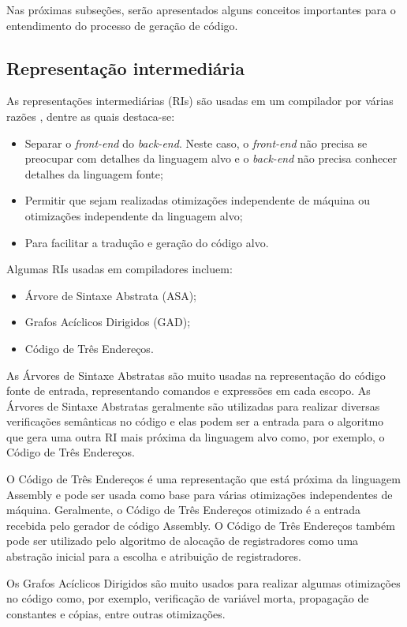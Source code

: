 \documentclass[
	12pt,				%
	openright,			%
	oneside,			%
	a4paper,			%
	main=brazil,
	english,			%
	]{ufsj-abntex2}
\begin{document}
Nas próximas subseções, serão apresentados alguns conceitos importantes para o entendimento do processo de geração de código. 

\subsection{Representação intermediária}

As representações intermediárias (RIs) são usadas em um compilador por várias razões \cite{dragonBook}, dentre as quais destaca-se: 
\begin{itemize}
    \item Separar o \textit{front-end} do \textit{back-end}. Neste caso, o \textit{front-end} não precisa se preocupar com detalhes da linguagem alvo e o \textit{back-end} não precisa conhecer detalhes da linguagem fonte;
    \item Permitir que sejam realizadas otimizações independente de máquina ou otimizações independente da linguagem alvo; 
    \item Para facilitar a tradução e geração do código alvo.    
\end{itemize}

Algumas RIs usadas em compiladores incluem:  
\begin{itemize}
    \item Árvore de Sintaxe Abstrata (ASA); 
    \item Grafos Acíclicos Dirigidos (GAD); 
    \item Código de Três Endereços. 
\end{itemize}

As Árvores de Sintaxe Abstratas são muito usadas na representação do código fonte de entrada, representando comandos e expressões em cada escopo. As Árvores de Sintaxe Abstratas geralmente são utilizadas para realizar diversas verificações semânticas no código e elas podem ser a entrada para o algoritmo que gera uma outra RI mais próxima da linguagem alvo como, por exemplo, o Código de Três Endereços. 

O Código de Três Endereços é uma representação que está próxima da linguagem Assembly e pode ser usada como base para várias otimizações independentes de máquina. Geralmente, o Código de Três Endereços otimizado é a entrada recebida pelo gerador de código Assembly. O Código de Três Endereços também pode ser utilizado pelo algoritmo de alocação de registradores como uma abstração inicial para a escolha e atribuição de registradores. 

Os Grafos Acíclicos Dirigidos são muito usados para realizar algumas otimizações no código como, por exemplo, verificação de variável morta, propagação de constantes e cópias, entre outras otimizações. 
\end{document}

